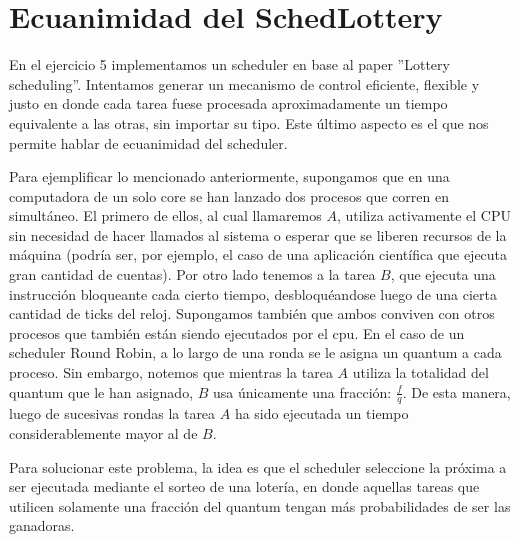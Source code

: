 \section{Ecuanimidad del SchedLottery}

En el ejercicio 5 implementamos un scheduler en base al paper ''Lottery scheduling''. Intentamos generar un mecanismo de control eficiente, flexible y justo en donde cada tarea fuese procesada
aproximadamente un tiempo equivalente a las otras, sin importar su tipo. Este último aspecto es el que nos permite hablar de ecuanimidad del scheduler.

Para ejemplificar lo mencionado anteriormente, supongamos que en una computadora de un solo core se han lanzado dos procesos que corren en simultáneo. El primero de ellos, al cual llamaremos $A$, utiliza
activamente el CPU sin necesidad de hacer llamados al sistema o esperar que se liberen recursos de la máquina (podría ser, por ejemplo, el caso de una aplicación científica que ejecuta gran cantidad de 
cuentas). Por otro lado tenemos a la tarea $B$, que ejecuta una instrucción bloqueante cada cierto tiempo, desbloquéandose luego de una cierta cantidad de ticks del reloj. Supongamos también que ambos conviven
con otros procesos que también están siendo ejecutados por el cpu. En el caso de un scheduler Round Robin, a lo largo de una ronda se le asigna un quantum a cada proceso. Sin embargo, notemos que mientras
la tarea $A$ utiliza la totalidad del quantum que le han asignado, $B$ usa únicamente una fracción: $\frac{f}{q}$. De esta manera, luego de sucesivas rondas la tarea $A$ ha sido ejecutada un tiempo
considerablemente mayor al de $B$.

Para solucionar este problema, la idea es que el scheduler seleccione la próxima a ser ejecutada mediante el sorteo de una lotería, en donde aquellas tareas que utilicen solamente una fracción del quantum
tengan más probabilidades de ser las ganadoras.





 
